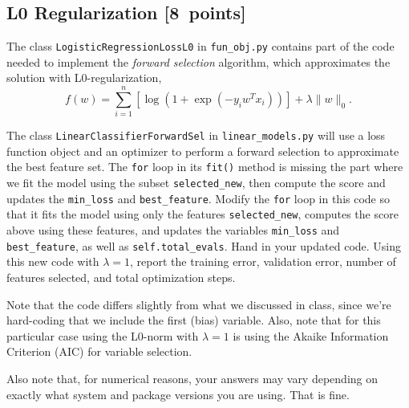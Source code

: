 \documentclass{article}
\newcommand{\blu}[1]{{\textcolor{blu}{#1}}}
\let\ask\blu
\newcommand\pts[1]{\textcolor{pointscolour}{[#1~points]}}
\newcommand{\norm}[1]{\lVert #1 \rVert}
\begin{document}
\subsection{L0 Regularization \pts{8}}

The class \verb|LogisticRegressionLossL0| in \verb|fun_obj.py| contains part of the code needed to implement the \emph{forward selection} algorithm,
which approximates the solution with L0-regularization,
\[
f(w) =  \sum_{i=1}^n \left[\log(1+\exp(-y_iw^Tx_i))\right] + \lambda\norm{w}_0.
\]

The class \verb|LinearClassifierForwardSel| in \verb|linear_models.py| will use a loss function object and an optimizer to perform a forward selection to approximate the best feature set.
The \verb|for| loop in its \verb|fit()| method is missing the part where we fit the model using the subset \verb|selected_new|,
then compute the score and updates the \verb|min_loss| and \verb|best_feature|.
Modify the \verb|for| loop in this code so that it fits the model using only
the features \verb|selected_new|, computes the score above using these features,
and updates the variables \verb|min_loss| and \verb|best_feature|,
as well as \verb|self.total_evals|.
\ask{Hand in your updated code. Using this new code with $\lambda=1$,
report the training error, validation error, number of features selected, and total optimization steps.}

Note that the code differs slightly from what we discussed in class,
since we're hard-coding that we include the first (bias) variable.
Also, note that for this particular case using the L0-norm with $\lambda=1$
is using the Akaike Information Criterion (AIC) for variable selection.

Also note that, for numerical reasons, your answers may vary depending on exactly what system and package versions you are using. That is fine.
\end{document}
